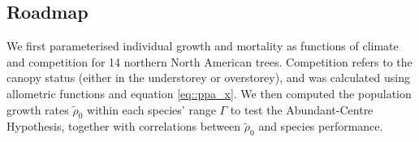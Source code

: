 \subsection{Roadmap}
We first parameterised individual growth and mortality as functions of climate and competition for 14 northern North American trees. Competition refers to the canopy status (either in the understorey or overstorey), and was calculated using allometric functions and equation \eqref{eq::ppa_x}. We then computed the population growth rates $ \tilde \rho_0 $ within each species' range $ \Gamma $ to test the Abundant-Centre Hypothesis, together with correlations between $ \tilde \rho_0 $ and species performance.